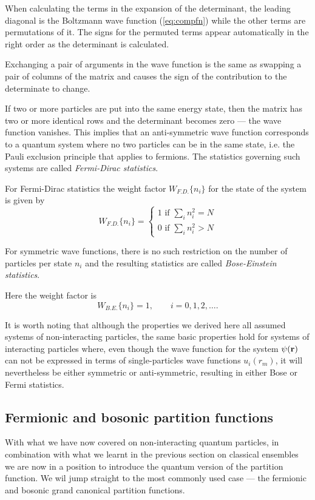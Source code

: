 When calculating the terms in the expansion of the determinant, the leading diagonal is the Boltzmann wave function (\ref{eq:compfn}) while the other terms are permutations of it. The signs for the permuted terms appear automatically in the right order as the determinant is calculated.

Exchanging a pair of arguments in the wave function is the same as swapping a pair of columns of the matrix and causes the sign of the contribution to the determinate to change.

If two or more particles are put into the same energy state, then the matrix has two or more identical rows and the determinant becomes zero --- the wave function vanishes. This implies that an anti-symmetric wave function corresponds to a quantum system where no two particles can be in the same state, i.e. the Pauli exclusion principle that applies to fermions. The statistics governing such systems are called \emph{Fermi-Dirac statistics}.

For Fermi-Dirac statistics the weight factor $W_{F.D.}\{n_i\}$ for the state of the system is given by
$$
	W_{F.D.}\{n_i\} = 
	\begin{cases}
		1 \text{ if } \sum_i n_i^2 = N\\
		0 \text{ if } \sum_i n_i^2 > N
	\end{cases}
$$


For symmetric wave functions, there is no such restriction on the number of particles per state $n_i$ and the resulting statistics are called \emph{Bose-Einstein statistics}.

Here the weight factor is
$$
	W_{B.E.}\{n_i\} = 1,\qquad i=0,1,2,\ldots.
$$

It is worth noting that although the properties we derived here all assumed systems of non-interacting particles, the same basic properties hold for systems of interacting particles where, even though the wave function for the system $\psi({\bf r})$ can not be expressed in terms of single-particles wave functions $u_i(r_m)$, it will nevertheless be either symmetric or anti-symmetric, resulting in either Bose or Fermi statistics.



\subsection{Fermionic and bosonic partition functions}
With what we have now covered on non-interacting quantum particles, in combination with what we learnt in the previous section on classical ensembles we are now in a position to introduce the quantum version of the partition function. We wil jump straight to the most commonly used case --- the fermionic and bosonic grand canonical partition functions.

